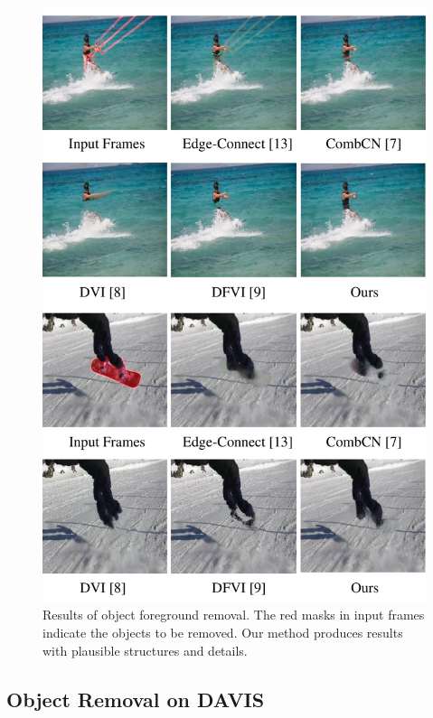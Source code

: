 \begin{figure}[!t]
	\centering
	\includegraphics[width=0.85\columnwidth]{vis_forg} %
	\caption{Results of object foreground removal. The red masks in input frames indicate the objects to be removed. Our method produces results with plausible structures and details.}
	\label{vis_forg}
\end{figure}

\subsection{Object Removal on DAVIS}


